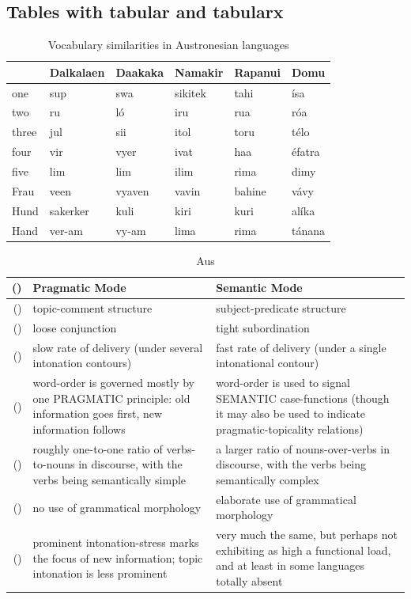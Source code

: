 \documentclass{article}
\begin{document}
\subsection{Tables with tabular and tabularx}

\begin{table}[H]\center
	\begin{tabular}{@{}llllll@{}}
\toprule
	& Dalkalaen & Daakaka & Namakir & Rapanui & Domu\\
\midrule
        one & sup & swa & sikitek &tahi & ísa\\
		  two & ru  & l\'o & iru & rua & róa \\
		three & jul & sii & itol & toru& télo\\
		four & vir & vyer & ivat & haa & éfatra\\
		five & lim & lim & ilim & rima & dimy\\
		Frau & veen & vyaven & vavin & bahine & vávy\\
		Hund & sakerker & kuli & kiri & kuri & alíka\\
		Hand & ver-am & vy-am & lima & rima & tánana\\
\bottomrule
	\end{tabular}
	\caption{Vocabulary similarities in Austronesian languages \citep[vgl.][]{greenhill2008austronesian}}
\end{table}

\begin{table}[H]\center{}
	\begin{tabularx}{\linewidth}{@{}>{\stepcounter{pragsem}(\alph{pragsem})}r>{\raggedright\arraybackslash}X>{\raggedright\arraybackslash}X}
	\toprule
 \multicolumn{1}{@{}l}{}& Pragmatic Mode & Semantic Mode\\
 \midrule
  & topic-comment structure & subject-predicate structure\\

&  loose conjunction & tight subordination\\
&slow rate of delivery (under several intonation contours) &
fast rate of delivery (under a single intonational contour)
\\
& word-order is governed mostly by one PRAGMATIC principle: old information goes first, new information follows &
word-order is used to signal SEMANTIC case-functions (though it may also be used to indicate pragmatic-topicality relations)
\\
& roughly one-to-one ratio of verbs-to-nouns in discourse, with the verbs being semantically simple &
a larger ratio of nouns-over-verbs in discourse, with the verbs being semantically complex
\\
& no use of grammatical morphology
&
elaborate use of grammatical morphology
\\

&prominent intonation-stress marks the focus of new information; topic intonation is less prominent &
very much the same, but perhaps not exhibiting as high a functional load, and at least in some languages totally absent
\\
\bottomrule
	\end{tabularx}
	\caption{Aus \citet[98]{givon1979discourse}}
\end{table}
\end{document}
